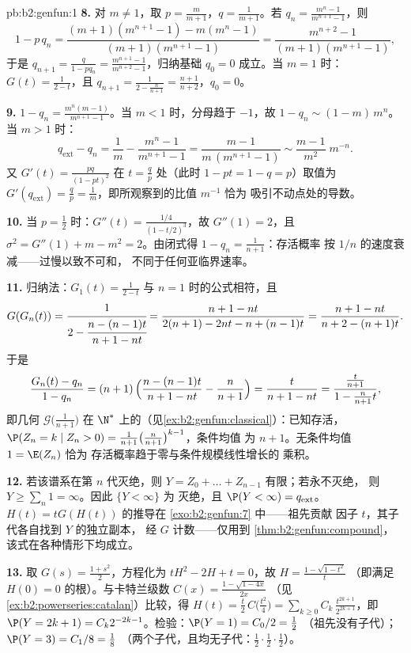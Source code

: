 \begin{solution}{pb:b2:genfun:1}
\textbf{8.} 对 $m \neq 1$，取 $p = \frac m{m+1}$，$q =
\frac1{m+1}$。若 $q_n = \frac{m^n - 1}{m^{n+1} - 1}$，则
\[
1 - p\,q_n = \frac{(m+1)(m^{n+1} - 1) - m(m^n - 1)}
{(m+1)(m^{n+1} - 1)} = \frac{m^{n+2} - 1}{(m+1)(m^{n+1} -
1)},
\]
于是 $q_{n+1} = \frac{q}{1 - pq_n} = \frac{m^{n+1} -
1}{m^{n+2} - 1}$，归纳基础 $q_0 = 0$ 成立。当 $m = 1$ 时：
$G(t) = \frac1{2 - t}$，且 $q_{n+1} = \frac1{2 -
\frac{n}{n+1}} = \frac{n+1}{n+2}$，$q_0 = 0$。

\textbf{9.} $1 - q_n = \frac{m^n(m - 1)}{m^{n+1} - 1}$。当
$m < 1$ 时，分母趋于 $-1$，故 $1 - q_n \sim (1 -
m)\,m^n$。当 $m > 1$ 时：
\[
q_{\mathrm{ext}} - q_n = \frac1m - \frac{m^n - 1}{m^{n+1} -
1} = \frac{m - 1}{m\,(m^{n+1} - 1)} \sim \frac{m -
1}{m^{2}}\;m^{-n} .
\]
又 $G'(t) = \frac{pq}{(1 - pt)^2}$ 在 $t = \frac
qp$ 处（此时 $1 - pt = 1 - q = p$）取值为 $G'(q_{\mathrm{ext}})
= \frac qp = \frac1m$，即所观察到的比值 $m^{-1}$ 恰为
吸引不动点处的导数。

\textbf{10.} 当 $p = \frac12$ 时：$G''(t) = \frac{1/4}{(1 -
t/2)^3}$，故 $G''(1) = 2$，且 $\sigma^2 = G''(1) + m - m^2 =
2$。由闭式得 $1 - q_n = \frac1{n+1}$：存活概率
按 $1/n$ 的速度衰减——过慢以致不可和，
不同于任何亚临界速率。

\textbf{11.} 归纳法：$G_1(t) = \frac1{2-t}$ 与
$n = 1$ 时的公式相符，且
\[
G(G_n(t)) = \cfrac{1}{2 - \cfrac{n - (n-1)t}{n+1 - nt}}
= \frac{n + 1 - nt}{2(n+1) - 2nt - n + (n-1)t}
= \frac{n+1 - nt}{n + 2 - (n+1)t} .
\]
于是
\[
\frac{G_n(t) - q_n}{1 - q_n}
= (n+1)\,\Bigl(\frac{n - (n-1)t}{n+1 - nt} -
\frac{n}{n+1}\Bigr)
= \frac{t}{n + 1 - nt}
= \frac{\frac{t}{n+1}}{1 - \frac{n}{n+1}t} ,
\]
即几何 $\mathcal G\bigl(\frac1{n+1}
\bigr)$ 在 $\N^*$ 上的（见\cref{ex:b2:genfun:classical}）：已知存活，
$\P(Z_n = k \mid Z_n > 0) =
\frac1{n+1}\bigl(\frac n{n+1}\bigr)^{k-1}$，条件均值
为 $n + 1$。无条件均值 $1 = \E(Z_n)$ 恰为
存活概率趋于零与条件规模线性增长的
乘积。

\textbf{12.} 若该谱系在第 $n$ 代灭绝，则
$Y = Z_0 + \dots + Z_{n-1}$ 有限；若永不灭绝，
则 $Y \geq \sum_n 1 = \infty$。因此 $\{Y < \infty\}$ 为
灭绝，且 $\P(Y < \infty) = q_{\mathrm{ext}}$。
$H(t) = tG(H(t))$ 的推导在
\cref{exo:b2:genfun:7} 中——祖先贡献
因子 $t$，其子代各自找到 $Y$ 的独立副本，
经 $G$ 计数——仅用到
\cref{thm:b2:genfun:compound}，该式在各种情形下均成立。

\textbf{13.} 取 $G(s) = \frac{1 + s^2}2$，方程化为
$tH^2 - 2H + t = 0$，故 $H = \frac{1 - \sqrt{1 - t^2}}{t}$
（即满足 $H(0) = 0$ 的根）。与卡特兰级数
$C(x) = \frac{1 - \sqrt{1 - 4x}}{2x}$
（见\cref{ex:b2:powerseries:catalan}）比较，得 $H(t) = \frac
t2\,C\bigl(\frac{t^2}4\bigr) =
\sum_{k\geq0}C_k\,\frac{t^{2k+1}}{2^{2k+1}}$，即 $\P(Y =
2k+1) = C_k2^{-2k-1}$。检验：$\P(Y = 1) = C_0/2 = \frac12$
（祖先没有子代）；$\P(Y = 3) = C_1/8 = \frac18$
（两个子代，且均无子代：$\frac12\cdot\frac12\cdot
\frac12$）。


\end{solution}
